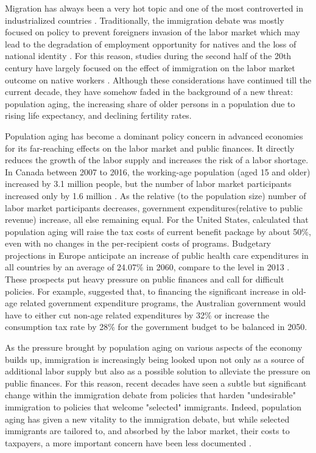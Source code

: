 Migration has always been a very hot topic and one of the most controverted in industrialized countries \citep{Marois:2020je}.
Traditionally, the immigration debate was mostly focused on policy to prevent foreigners invasion of the labor market which may lead to the degradation of employment opportunity for natives \citep{Fusaro:2018wi} and the loss of national identity \citep{Castles:2012vr}.
For this reason, studies during the second half of the 20th century have largely focused on the effect of immigration on the labor market outcome on native workers \citep{Piche:2013ir}.
Although these considerations have continued till the current decade, they have somehow faded in the background of a new threat: population aging, the increasing share of older persons in a population due to rising life expectancy, and declining fertility rates.

\vspace{0.7em}\par
Population aging has become a dominant policy concern in advanced economies for its far-reaching effects on the labor market and public finances.
It directly reduces the growth of the labor supply and increases the risk of a labor shortage.
In Canada between 2007 to 2016, the working-age population (aged 15 and older) increased by 3.1 million people, but the number of labor market participants increased only by 1.6 million \citep{Fields:2017wa}.
As the relative (to the population size) number of labor market participants decreases, government expenditures(relative to public revenue) increase, all else remaining equal.
For the United States, \citet{Lee:bKjc_XK_} calculated that population aging will raise the tax costs of current benefit package by about 50\%, even with no changes in the per-recipient costs of programs.
Budgetary projections in Europe anticipate an increase of public health care expenditures in all countries by an average of 24.07\% in 2060, compare to the level in 2013 \citep{Zokalj:2016bq}.
These prospects put heavy pressure on public finances and call for difficult policies.
For example, \citet{Kudrna:2015dr} suggested that, to financing the significant increase in old-age related government expenditure programs, the Australian government would have to either cut non-age related expenditures by 32\% or increase the consumption tax rate by 28\% for the government budget to be balanced in 2050.

\vspace{0.7em}\par
As the pressure brought by population aging on various aspects of the economy builds up, immigration is increasingly being looked upon not only as a source of additional labor supply but also as a possible solution to alleviate the pressure on public finances.
For this reason, recent decades have seen a subtle but significant change within the immigration debate from policies that harden "undesirable" immigration to policies that welcome "selected" immigrants.
Indeed, population aging has given a new vitality to the immigration debate, but while selected immigrants are tailored to, and absorbed by the labor market, their costs to taxpayers, a more important concern have been less documented \citep{Dustmann:2007fl}.

